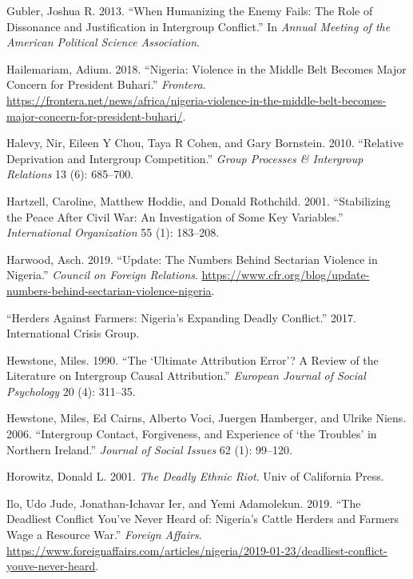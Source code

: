 \documentclass[11pt]{article}
\begin{document}
\leavevmode\hypertarget{ref-gubler2013humanizing}{}%
Gubler, Joshua R. 2013. ``When Humanizing the Enemy Fails: The Role of
Dissonance and Justification in Intergroup Conflict.'' In \emph{Annual
Meeting of the American Political Science Association}.

\leavevmode\hypertarget{ref-frontera2018nigeria}{}%
Hailemariam, Adium. 2018. ``Nigeria: Violence in the Middle Belt Becomes
Major Concern for President Buhari.'' \emph{Frontera}.
\url{https://frontera.net/news/africa/nigeria-violence-in-the-middle-belt-becomes-major-concern-for-president-buhari/}.

\leavevmode\hypertarget{ref-halevy2010relative}{}%
Halevy, Nir, Eileen Y Chou, Taya R Cohen, and Gary Bornstein. 2010.
``Relative Deprivation and Intergroup Competition.'' \emph{Group
Processes \& Intergroup Relations} 13 (6): 685--700.

\leavevmode\hypertarget{ref-hartzell2001stabilizing}{}%
Hartzell, Caroline, Matthew Hoddie, and Donald Rothchild. 2001.
``Stabilizing the Peace After Civil War: An Investigation of Some Key
Variables.'' \emph{International Organization} 55 (1): 183--208.

\leavevmode\hypertarget{ref-council2019nigeria}{}%
Harwood, Asch. 2019. ``Update: The Numbers Behind Sectarian Violence in
Nigeria.'' \emph{Council on Foreign Relations}.
\url{https://www.cfr.org/blog/update-numbers-behind-sectarian-violence-nigeria}.

\leavevmode\hypertarget{ref-icg2017nigeria}{}%
``Herders Against Farmers: Nigeria's Expanding Deadly Conflict.'' 2017.
International Crisis Group.

\leavevmode\hypertarget{ref-hewstone1990ultimate}{}%
Hewstone, Miles. 1990. ``The `Ultimate Attribution Error'? A Review of
the Literature on Intergroup Causal Attribution.'' \emph{European
Journal of Social Psychology} 20 (4): 311--35.

\leavevmode\hypertarget{ref-hewstone2006intergroup}{}%
Hewstone, Miles, Ed Cairns, Alberto Voci, Juergen Hamberger, and Ulrike
Niens. 2006. ``Intergroup Contact, Forgiveness, and Experience of `the
Troubles' in Northern Ireland.'' \emph{Journal of Social Issues} 62 (1):
99--120.

\leavevmode\hypertarget{ref-horowitz2001deadly}{}%
Horowitz, Donald L. 2001. \emph{The Deadly Ethnic Riot}. Univ of
California Press.

\leavevmode\hypertarget{ref-fa2019deadly}{}%
Ilo, Udo Jude, Jonathan-Ichavar Ier, and Yemi Adamolekun. 2019. ``The
Deadliest Conflict You've Never Heard of: Nigeria's Cattle Herders and
Farmers Wage a Resource War.'' \emph{Foreign Affairs}.
\url{https://www.foreignaffairs.com/articles/nigeria/2019-01-23/deadliest-conflict-youve-never-heard}.
\end{document}
